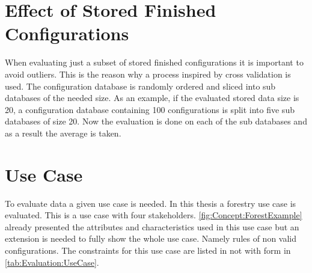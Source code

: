 \section{Effect of Stored Finished Configurations}
\label{sec:Evaluation:EffectFinishedConfiguration}

When evaluating just a subset of stored finished configurations it is important to avoid outliers. This is the reason why a process inspired by cross validation is used. The configuration database is randomly ordered and sliced into sub databases of the needed size. As an example, if the evaluated stored data size is 20, a configuration database containing 100 configurations is split into five sub databases of size 20. Now the evaluation is done on each of the sub databases and as a result the average is taken.

\section{Use Case}
\label{sec:Evaluation:UseCase}

To evaluate data a given use case is needed. In this thesis a forestry use case is evaluated. This is a use case with four stakeholders. \autoref{fig:Concept:ForestExample} already presented the attributes and characteristics used in this use case but an extension is needed to fully show the whole use case. Namely rules of non valid configurations. The constraints for this use case are listed in not with form in \autoref{tab:Evaluation:UseCase}. 

